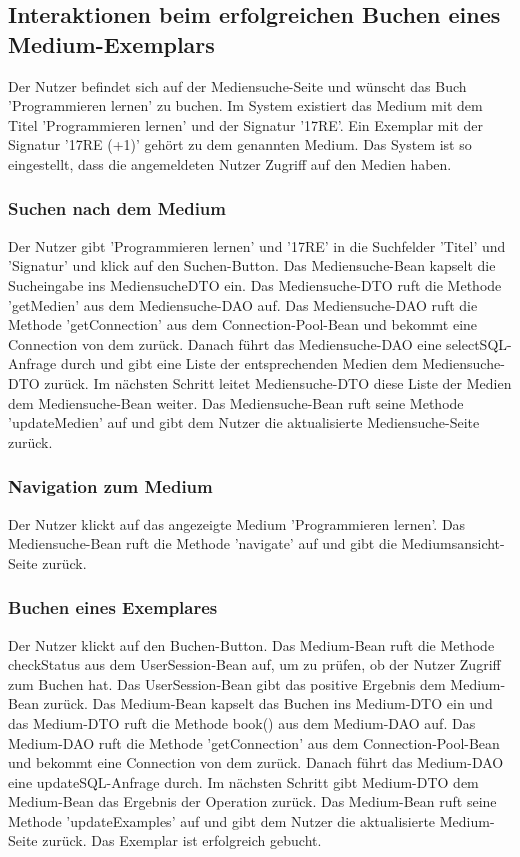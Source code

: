 \documentclass{article}
\begin{document}
\subsection{Interaktionen beim erfolgreichen Buchen eines Medium-Exemplars}
Der Nutzer befindet sich auf der Mediensuche-Seite und wünscht das Buch 'Programmieren lernen' zu buchen. Im System existiert das Medium mit dem Titel 'Programmieren lernen' und der Signatur '17RE'. Ein Exemplar mit der Signatur '17RE (+1)' gehört zu dem genannten Medium. Das System ist so eingestellt, dass die angemeldeten Nutzer Zugriff auf den Medien haben.
\subsubsection{Suchen nach dem Medium}
Der Nutzer gibt 'Programmieren lernen' und '17RE' in die Suchfelder 'Titel' und 'Signatur' und klick auf den Suchen-Button. Das Mediensuche-Bean kapselt die Sucheingabe ins MediensucheDTO ein. Das Mediensuche-DTO ruft die Methode 'getMedien' aus dem Mediensuche-DAO auf. Das Mediensuche-DAO ruft die Methode 'getConnection' aus dem Connection-Pool-Bean und bekommt eine Connection von dem zurück. Danach führt das Mediensuche-DAO eine selectSQL-Anfrage durch und gibt eine Liste der entsprechenden Medien dem Mediensuche-DTO zurück. Im nächsten Schritt leitet Mediensuche-DTO diese Liste der Medien dem Mediensuche-Bean weiter. Das Mediensuche-Bean ruft seine Methode 'updateMedien' auf und gibt dem Nutzer die aktualisierte Mediensuche-Seite zurück.
\subsubsection{Navigation zum Medium}
Der Nutzer klickt auf das angezeigte Medium 'Programmieren lernen'. Das Mediensuche-Bean ruft die Methode 'navigate' auf und gibt die Mediumsansicht-Seite zurück.
\subsubsection{Buchen eines Exemplares}
Der Nutzer klickt auf den Buchen-Button. Das Medium-Bean ruft die Methode checkStatus aus dem UserSession-Bean auf, um zu prüfen, ob der Nutzer Zugriff zum Buchen hat. Das UserSession-Bean gibt das positive Ergebnis dem Medium-Bean zurück. Das Medium-Bean kapselt das Buchen ins Medium-DTO ein und das Medium-DTO ruft die Methode book() aus dem Medium-DAO auf. Das Medium-DAO ruft die Methode 'getConnection' aus dem Connection-Pool-Bean und bekommt eine Connection von dem zurück. Danach führt das Medium-DAO eine updateSQL-Anfrage durch. Im nächsten Schritt gibt Medium-DTO  dem Medium-Bean das Ergebnis der Operation zurück. Das Medium-Bean ruft seine Methode 'updateExamples' auf und gibt dem Nutzer die aktualisierte Medium-Seite zurück. Das Exemplar ist erfolgreich gebucht.
\end{document}
